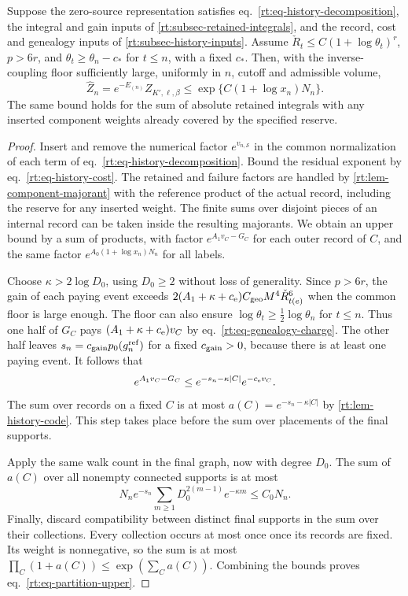 \documentclass[11pt,letterpaper,reqno]{amsart}
\makeatletter
\numberwithin{equation}{section}
\renewcommand{\eqref}[1]{\textup{eq.~\ref{#1}}}
\theoremstyle{definition}
\newcommand{\ms@minorstart}{%
  \pushQED{\qed}\renewcommand{\qedsymbol}{$\blacksquare$}}
\newenvironment{proposition}[1][]{\ms@minorstart\ms@proposition[#1]}
  {\popQED\endms@proposition}
\theoremstyle{remark}
\makeatother
\begin{document}
\begin{proposition}[Upper bound for the history sum]
\label{rt:prop-history-upper}
Suppose the zero-source representation satisfies
\eqref{rt:eq-history-decomposition}, the integral and gain inputs
of \cref{rt:subsec-retained-integrals}, and the record, cost and
genealogy inputs of \cref{rt:subsec-history-inputs}. Assume
\(\check R_t\le C(1+\log\theta_t)^r\), \(p>6r\), and
\(\theta_t\ge\theta_n-c_*\) for \(t\le n\), with a fixed
\(c_*\). Then, with the inverse-coupling floor sufficiently
large, uniformly in \(n\), cutoff and admissible volume,
\begin{equation}\label{rt:eq-partition-upper}
    \widehat Z_n=e^{-E_{(n)}}Z_{K',\ell,\beta}
          \le \exp\{C(1+\log x_n)N_n\}.
\end{equation}
The same bound holds for the sum of absolute retained integrals
with any inserted component weights already covered by the
specified reserve.
\end{proposition}
\begin{proof}
Insert and remove the numerical factor \(e^{v_{n,\mathcal S}}\)
in the common normalization of each term of
\eqref{rt:eq-history-decomposition}. Bound the residual
exponent by \eqref{rt:eq-history-cost}. The retained and
failure factors are handled by \cref{rt:lem-component-majorant}
with the reference product of the actual record, including the
reserve for any inserted weight. The finite sums over disjoint
pieces of an internal record can be taken inside the resulting
majorants. We obtain an upper bound by a sum of products, with
factor \(e^{A_1v_C-G_C}\) for each outer record of \(C\), and
the same factor \(e^{A_0(1+\log x_n)N_n}\) for all labels.

Choose \(\kappa>2\log D_0\), using \(D_0\ge2\) without loss
of generality. Since \(p>6r\), the gain of each paying event
exceeds \(2(A_1+\kappa+c_{\rm e})C_{\rm geo}
M^4\check R_{t(e)}^6\) when the common floor is large
enough. The floor can also ensure
\(\log\theta_t\ge\tfrac12\log\theta_n\) for \(t\le n\).
Thus one half of \(G_C\) pays \((A_1+\kappa+c_{\rm e})v_C\)
by \eqref{rt:eq-genealogy-charge}. The other half leaves
\(s_n=c_{\rm gain}p_0(g_n^{\rm ref})\) for a fixed \(c_{\rm gain}>0\), because there
is at least one paying event. It follows that
\[
       e^{A_1v_C-G_C}
        \le e^{-s_n-\kappa|C|}e^{-c_{\rm e}v_C}.
\]
The sum over records on a fixed \(C\) is at most
\(a(C)=e^{-s_n-\kappa|C|}\) by \cref{rt:lem-history-code}.
This step takes place before the sum over placements of the
final supports.

Apply the same walk count in the final graph, now with
degree \(D_0\). The sum of \(a(C)\) over all nonempty
connected supports is at most
\[
   N_n e^{-s_n}\sum_{m\ge1}D_0^{2(m-1)}e^{-\kappa m}
       \le C_0 N_n .
\]
Finally, discard compatibility between distinct final supports
in the sum over their collections. Every collection occurs
at most once once its records are fixed. Its weight is
nonnegative, so the sum is at most
\(\prod_C(1+a(C))\le\exp(\sum_C a(C))\).
Combining the bounds proves \eqref{rt:eq-partition-upper}.
\end{proof}
\end{document}
